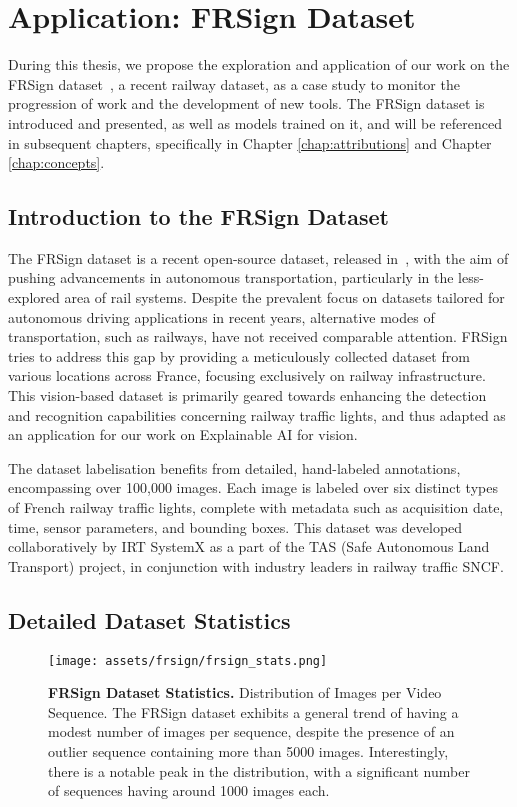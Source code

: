 \section{Application: FRSign Dataset}
\label{sec:intro:frsign}

During this thesis, we propose the exploration and application of our work on the FRSign dataset~\cite{2020frsign}, a recent railway dataset, as a case study to monitor the progression of work and the development of new tools. The FRSign dataset is introduced and presented, as well as models trained on it, and will be referenced in subsequent chapters, specifically in Chapter \autoref{chap:attributions} and Chapter \autoref{chap:concepts}.

\subsection{Introduction to the FRSign Dataset}

The FRSign dataset is a recent open-source dataset, released in~\cite{2020frsign}, with the aim of pushing advancements in autonomous transportation, particularly in the less-explored area of rail systems. Despite the prevalent focus on datasets tailored for autonomous driving applications in recent years, alternative modes of transportation, such as railways, have not received comparable attention. FRSign tries to address this gap by providing a meticulously collected dataset from various locations across France, focusing exclusively on railway infrastructure. This vision-based dataset is primarily geared towards enhancing the detection and recognition capabilities concerning railway traffic lights, and thus adapted as an application for our work on Explainable AI for vision.

The dataset labelisation benefits from detailed, hand-labeled annotations,
encompassing over 100,000 images. Each image is labeled over six distinct types of French railway traffic lights, complete with metadata such as acquisition date, time, sensor parameters, and bounding boxes. This dataset was developed collaboratively by IRT SystemX as a part of the TAS (Safe Autonomous Land Transport) project, in conjunction with industry leaders in railway traffic SNCF.

\subsection{Detailed Dataset Statistics}

\begin{figure}[ht]
    \centering
    \texttt{[image: assets/frsign/frsign\_stats.png]}
    \caption{\textbf{FRSign Dataset Statistics.} Distribution of Images per Video Sequence. The FRSign dataset exhibits a general trend of having a modest number of images per sequence, despite the presence of an outlier sequence containing more than 5000 images. Interestingly, there is a notable peak in the distribution, with a significant number of sequences having around 1000 images each.}
    \label{fig:frsign:stats}
\end{figure}

